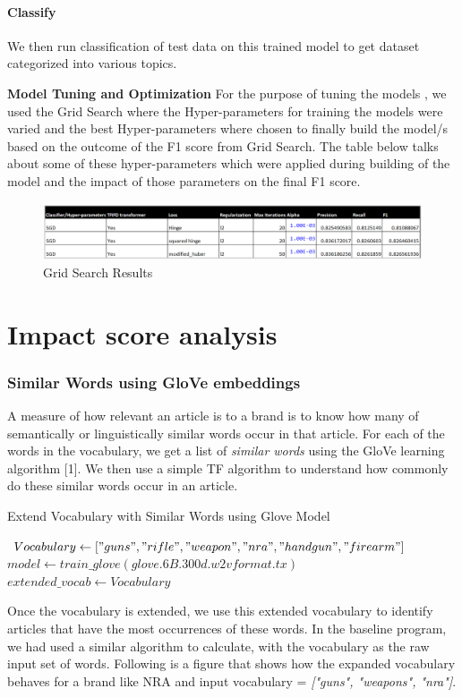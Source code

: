 \documentclass[paper=a4, fontsize=11pt]{scrartcl}
\numberwithin{equation}{section}		%
\numberwithin{figure}{section}			%
\numberwithin{table}{section}				%
\begin{document}
\paragraph{Classify} We then run classification of test data on this trained model to get dataset categorized into various topics.

\textbf{Model Tuning and Optimization}
For the purpose of tuning the models , we used the Grid Search where the Hyper-parameters for training the models were varied and the best Hyper-parameters where chosen to finally build the model/s based on the outcome of the F1 score from Grid Search.  The table below talks about some of these hyper-parameters which were applied during building of the model and the impact of those parameters on the final F1 score.   
\begin{figure}
	\centering
 	 \includegraphics[width=0.6\linewidth]{Grid-Search.png}
	  \caption{Grid Search Results}
 	 \label{fig:Grid Search.png}
\end{figure}


\section{Impact score analysis}
\subsubsection {Similar Words using GloVe embeddings}
A measure of how relevant an article is to a brand is to know how many of semantically or linguistically similar words occur in that article. For each of the words in the vocabulary, we get a list of \textit{similar words} using the GloVe learning algorithm [1]. We then use a simple TF algorithm to understand how commonly do these similar words occur in an article.
\begin{center}
\begin{algorithm}
  \caption{Extend Vocabulary with Similar Words using Glove Model}

 $Vocabulary \gets ["guns", "rifle", "weapon", "nra", "handgun", "firearm"] $\;
 $model \gets train\_glove(\textit{glove.6B.300d.w2vformat.tx}) $\;
  {
      $extended\_vocab \gets Vocabulary $\;
    \;
  }
\end{algorithm}
\end{center}
Once the vocabulary is extended, we use this extended vocabulary to identify articles that have the most occurrences of these words. In the baseline program, we had used a similar algorithm to calculate, with the vocabulary as the raw input set of words. Following is a figure that shows how the expanded vocabulary behaves for a brand like NRA and input vocabulary = \textit {["guns", "weapons", "nra"]}.
\end{document}
